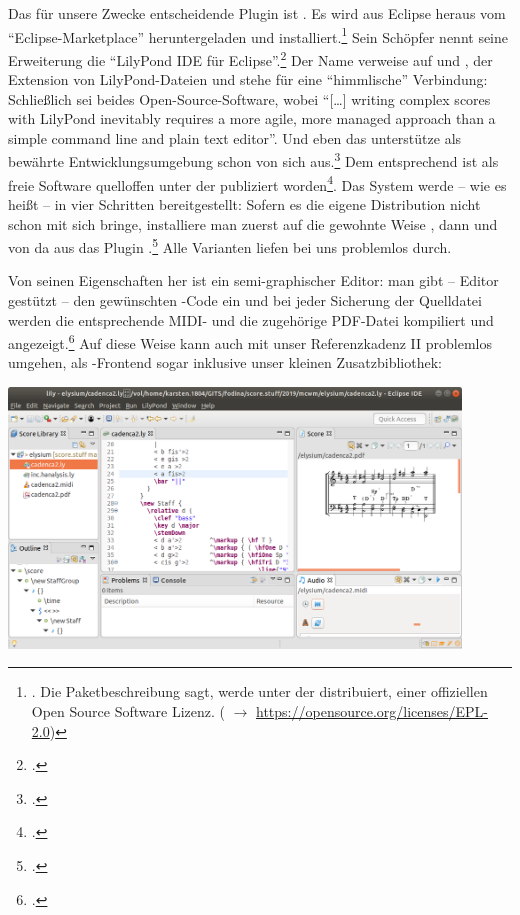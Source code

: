 Das für unsere Zwecke entscheidende Plugin ist . Es wird aus
Eclipse heraus vom \enquote{Eclipse-Marketplace} heruntergeladen und
installiert.\footnote{\cite[vgl.][\nopage wp]{Harmath2019a}. Die
Paketbeschreibung sagt,  werde unter der  distribuiert, einer offiziellen Open Source Software Lizenz.
( $\rightarrow$ \href{https://opensource.org/licenses/EPL-2.0}
{https://opensource.org/licenses/EPL-2.0}) } Sein Schöpfer nennt seine
Erweiterung die \enquote{LilyPond IDE für Eclipse}.\footcite[vgl.][\nopage
wp]{Harmath2019b} Der Name  verweise auf  und
, der Extension von LilyPond-Dateien und stehe für eine
\enquote{himmlische} Verbindung: Schließlich sei beides Open-Source-Software,
wobei \enquote{[\ldots] writing complex scores with LilyPond inevitably requires
a more agile, more managed approach than a simple command line and plain text
editor}. Und eben das unterstütze  als bewährte
Entwicklungsumgebung schon von sich aus.\footcite[vgl.][\nopage
wp]{Harmath2019d} Dem entsprechend ist  als freie Software
quelloffen unter der  publiziert
worden\footcite[vgl.][\nopage wp]{Harmath2018a}. Das System werde -- wie es
heißt -- in vier Schritten bereitgestellt: Sofern es die eigene Distribution
nicht schon mit sich bringe, installiere man zuerst auf die gewohnte Weise
, dann  und von da aus das Plugin
.\footcite[vgl.][\nopage wp]{Harmath2019c} Alle Varianten liefen
bei uns problemlos durch.

Von seinen Eigenschaften her ist  ein semi-graphischer Editor: man
gibt -- Editor gestützt -- den gewünschten -Code ein und bei jeder
Sicherung der Quelldatei werden die entsprechende MIDI- und die zugehörige
PDF-Datei kompiliert und angezeigt.\footcite[vgl.][\nopage wp]{Harmath2019e} Auf
diese Weise kann  auch mit unser Referenzkadenz II problemlos
umgehen, als -Frontend sogar inklusive unser kleinen
Zusatzbibliothek:

\begin{center}
\includegraphics[width=0.9\textwidth]{frontends/elysium/elysium-cadenca2-300dpi.png}
\end{center}

